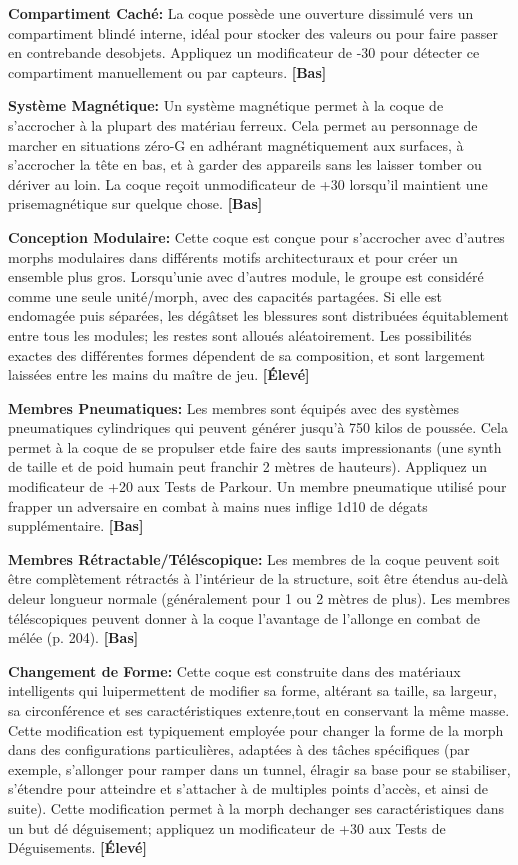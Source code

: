 \textbf{Compartiment Caché:} La coque possède une ouverture dissimulé vers un compartiment blindé interne, idéal pour stocker des valeurs ou pour faire passer en contrebande desobjets. Appliquez un modificateur de -30 pour détecter ce compartiment manuellement ou par capteurs. \textbf{[Bas]} 

\textbf{Système Magnétique:} Un système magnétique permet à la coque de s'accrocher à la plupart des matériau ferreux. Cela permet au personnage de marcher en situations zéro-G en adhérant magnétiquement aux surfaces, à s'accrocher la tête en bas, et à garder des appareils sans les laisser tomber ou dériver au loin. La coque reçoit unmodificateur de +30 lorsqu'il maintient une prisemagnétique sur quelque chose. \textbf{[Bas]} 

\textbf{Conception Modulaire:} Cette coque est conçue pour s'accrocher avec d'autres morphs modulaires dans différents motifs architecturaux et pour créer un ensemble plus gros. Lorsqu'unie avec d'autres module, le groupe est considéré comme une seule unité/morph, avec des capacités partagées. Si elle est endomagée puis séparées, les dégâtset les blessures sont distribuées équitablement entre tous les modules; les restes sont alloués aléatoirement. Les possibilités exactes des différentes formes dépendent de sa composition, et sont largement laissées entre les mains du maître de jeu. \textbf{[Élevé]} 

\textbf{Membres Pneumatiques:} Les membres sont équipés avec des systèmes pneumatiques cylindriques qui peuvent générer jusqu'à 750 kilos de poussée. Cela permet à la coque de se propulser etde faire des sauts impressionants (une synth de taille et de poid humain peut franchir 2 mètres de hauteurs). Appliquez un modificateur de +20 aux Tests de Parkour. Un membre pneumatique utilisé pour frapper un adversaire en combat à mains nues inflige 1d10 de dégats supplémentaire. \textbf{[Bas]} 

\textbf{Membres Rétractable/Téléscopique:} Les membres de la coque peuvent soit être complètement rétractés à l'intérieur de la structure, soit être étendus au-delà deleur longueur normale (généralement pour 1 ou 2 mètres de plus). Les membres téléscopiques peuvent donner à la coque l'avantage de l'allonge en combat de mélée (p. 204). \textbf{[Bas]} 

\textbf{Changement de Forme:} Cette coque est construite dans des matériaux intelligents qui luipermettent de modifier sa forme, altérant sa taille, sa largeur, sa circonférence et ses caractéristiques extenre,tout en conservant la même masse. Cette modification est typiquement employée pour changer la forme de la morph dans des configurations particulières, adaptées à des tâches spécifiques (par exemple, s'allonger pour ramper dans un tunnel, élragir sa base pour se stabiliser, s'étendre pour atteindre et s'attacher à de multiples points d'accès, et ainsi de suite). Cette modification permet à la morph dechanger ses caractéristiques dans un but dé déguisement; appliquez un modificateur de +30 aux Tests de Déguisements. \textbf{[Élevé]} 

